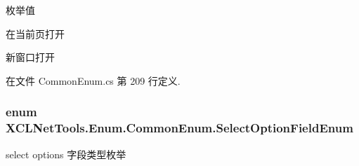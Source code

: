 \begin{Desc}
\item[枚举值]\par
\begin{description}
\item[{\em 
\hypertarget{class_x_c_l_net_tools_1_1_enum_1_1_common_enum_a1cd31513e5ecf78c77d76be7954ae2f4a6adf97f83acf6453d4a6a4b1070f3754}{None}\label{class_x_c_l_net_tools_1_1_enum_1_1_common_enum_a1cd31513e5ecf78c77d76be7954ae2f4a6adf97f83acf6453d4a6a4b1070f3754}
}]在当前页打开 \item[{\em 
\hypertarget{class_x_c_l_net_tools_1_1_enum_1_1_common_enum_a1cd31513e5ecf78c77d76be7954ae2f4aa9453646c9602d8a4f00d42b7c9844ab}{New\-Blank}\label{class_x_c_l_net_tools_1_1_enum_1_1_common_enum_a1cd31513e5ecf78c77d76be7954ae2f4aa9453646c9602d8a4f00d42b7c9844ab}
}]新窗口打开 \end{description}
\end{Desc}


在文件 Common\-Enum.\-cs 第 209 行定义.

\hypertarget{class_x_c_l_net_tools_1_1_enum_1_1_common_enum_afe1323cff3b78e93907bf636697b2b59}{
\subsubsection[{Select\-Option\-Field\-Enum}]{\setlength{\rightskip}{0pt plus 5cm}enum {\bf X\-C\-L\-Net\-Tools.\-Enum.\-Common\-Enum.\-Select\-Option\-Field\-Enum}}}\label{class_x_c_l_net_tools_1_1_enum_1_1_common_enum_afe1323cff3b78e93907bf636697b2b59}


select options 字段类型枚举 

